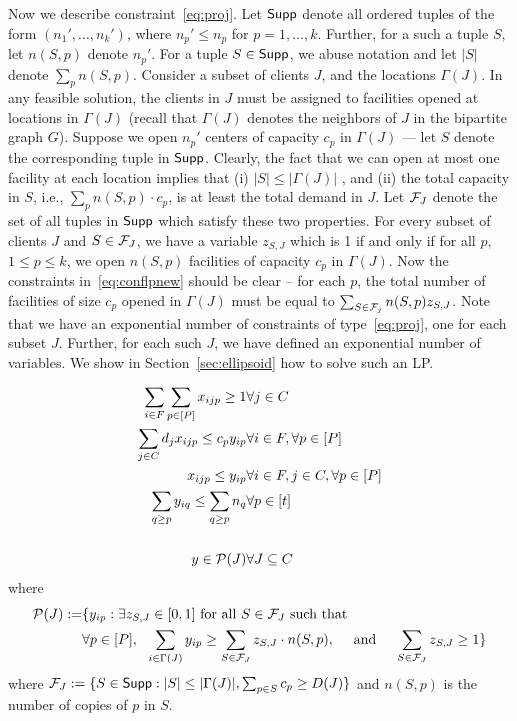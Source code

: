Now we describe constraint~\eqref{eq:proj}.
Let $\mathsf{Supp}$ denote all ordered tuples of the form
$(n_1', \ldots, n_k')$, where $n_p' \leq n_p$ for $p=1, \ldots, k$. Further, for a such a tuple $S$, let $n(S,p)$ denote $n_p'$.
For a tuple  $S \in \mathsf{Supp}$, we abuse notation and let $|S|$ denote $\sum_p n(S,p)$.
 Consider a subset of clients $J$, and the locations $\Gamma(J)$.
 In any feasible solution, the clients in $J$ must be assigned to facilities opened at locations in $\Gamma(J)$ (recall that $\Gamma(J)$ denotes
 the neighbors of $J$ in the bipartite graph $G$).
 Suppose we open $n_p'$ centers of capacity $c_p$ in $\Gamma(J)$ --- let $S$ denote the corresponding tuple
 in $\mathsf{Supp}$. Clearly, the fact that we can open at most one facility at each location implies that (i) $|S| \leq |\Gamma(J)|$ , and (ii) the total capacity in $S$, i.e.,
 $\sum_p n(S,p) \cdot c_p$, is at least the total demand in $J$. Let ${\cal F}_J$ denote the set of all tuples
 in $\mathsf{Supp}$ which satisfy these two properties. For every subset of clients $J$ and $S \in {\cal F}_J$, we have a variable $z_{S,J}$ which is 1 if and only if
 for all $p$, $1 \leq p \leq k$,
 we open $n(S,p)$ facilities of capacity $c_p$ in $\Gamma(J)$. Now the constraints in~\eqref{eq:conflpnew} should be clear -- for each $p$, the total number of
 facilities of size $c_p$ opened in $\Gamma(J)$ must be equal to $\sum_{S \in {\cal F}_j} n(S,p) z_{S,J}$. Note that we have an exponential number of constraints of type~\eqref{eq:proj}, one for each subset $J$. Further, for each such $J$, we have defined an exponential number of variables. We show in Section~\ref{sec:ellipsoid} how to solve such an LP.




\begin{eqnarray}
\sum_{i\in F} \sum_{p\in [P]}  x_{ijp} \geq 1 & \forall j\in C  \label{eq:mkc1-full} \\
\sum_{j\in C} d_j x_{ijp} \leq c_p y_{ip} & \forall i \in F, \forall p\in [P] \label{eq:mkc2-full} \\
x_{ijp} \leq y_{ip} & \forall i\in F, j\in C,\forall p\in [P] \label{eq:mkc3-full}\\
\sum_{q \geq p} y_{iq}   \leq \sum_{q\geq p} n_q & \forall p\in [t] \label{eq:mkc4-full}\\
\nonumber \\
y \in {\cal P}(J) & \forall J\subseteq C \label{eq:proj}
\end{eqnarray}
\noindent
where
\begin{eqnarray}
{\cal P}(J) := & \{ y_{ip}: \exists z_{S,J}\in [0,1] \textrm{ for all } S\in {\cal F}_J \textrm{ such that }  \notag \\
& \forall p\in [P], ~~ \sum_{i\in \Gamma(J)} y_{ip} \geq \sum_{S\in {\cal F}_{J}} z_{S,J}\cdot n(S,p), ~~~~ \textrm{and}~~~~ \sum_{S\in {\cal F}_{J}} z_{S,J} \geq 1 \} \label{eq:conflpnew}
\end{eqnarray}
where ${\cal F}_{J} := \{S\in \mathsf{Supp}: |S| \leq |\Gamma(J)|, \sum_{p\in S} c_p \geq D(J)\}$ and $n(S,p)$ is the number of copies of  $p$ in $S$. \bigskip


